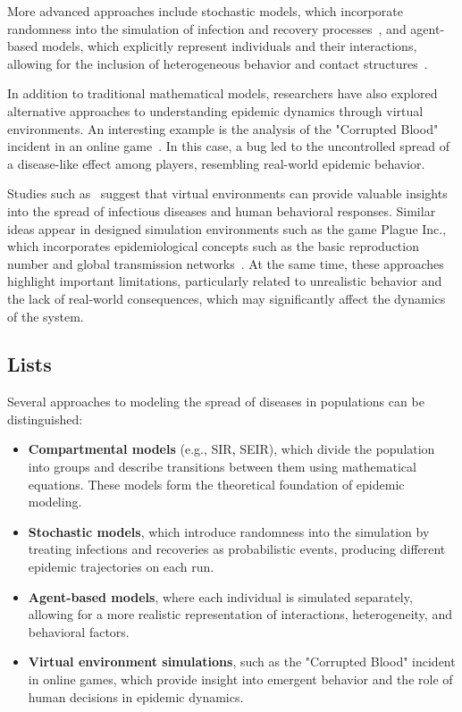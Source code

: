 \documentclass[english]{projectreport}
\begin{document}
More advanced approaches include stochastic models, which incorporate randomness into the simulation of infection and recovery processes~\cite{allen2017primer}, and agent-based models, which explicitly represent individuals and their interactions, allowing for the inclusion of heterogeneous behavior and contact structures~\cite{cdc2025transmission}.

In addition to traditional mathematical models, researchers have also explored alternative approaches to understanding epidemic dynamics through virtual environments. An interesting example is the analysis of the "Corrupted Blood" incident in an online game~\cite{lofgren2007virtual}. In this case, a bug led to the uncontrolled spread of a disease-like effect among players, resembling real-world epidemic behavior.

Studies such as~\cite{lofgren2007virtual} suggest that virtual environments can provide valuable insights into the spread of infectious diseases and human behavioral responses. Similar ideas appear in designed simulation environments such as the game Plague Inc., which incorporates epidemiological concepts such as the basic reproduction number and global transmission networks~\cite{cornellPlagueInc2014, gideonR02024}. At the same time, these approaches highlight important limitations, particularly related to unrealistic behavior and the lack of real-world consequences, which may significantly affect the dynamics of the system.

\subsection{Lists}
\label{sec:lists}

Several approaches to modeling the spread of diseases in populations can be distinguished:

\begin{itemize}
\item \textbf{Compartmental models} (e.g., SIR, SEIR), which divide the population into groups and describe transitions between them using mathematical equations. These models form the theoretical foundation of epidemic modeling.

\item \textbf{Stochastic models}, which introduce randomness into the
  simulation by treating infections and recoveries as probabilistic
  events, producing different epidemic trajectories on each run.

\item \textbf{Agent-based models}, where each individual is simulated separately, allowing for a more realistic representation of interactions, heterogeneity, and behavioral factors.

\item \textbf{Virtual environment simulations}, such as the "Corrupted Blood" incident in online games, which provide insight into emergent behavior and the role of human decisions in epidemic dynamics.
\end{itemize}
\end{document}
